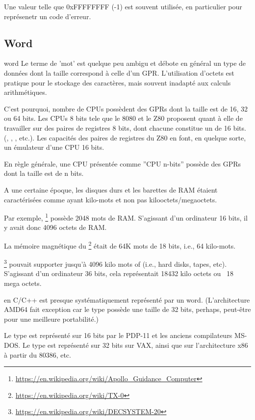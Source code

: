 Une valeur telle que 0xFFFFFFFF (-1) est souvent utilisée, en particulier pour représenetr un code d'erreur.

\subsection{Word}

\gls{word} Le terme de 'mot' est quelque peu ambigu et débote en général un type de données dont la taille correspond à celle d'un \ac{GPR}.
L'utilisation d'octets est pratique pour le stockage des caractères, mais souvent inadapté aux calculs arithmétiques.

C'est pourquoi, nombre de \ac{CPU}s possèdent des \ac{GPR}s dont la taille est de 16, 32 ou 64 bits.
Les CPUs 8 bits tele que le 8080 et le Z80 proposent quant à elle de travailler sur des paires de registres 8 bits, dont chacune constitue un  de 16 bits.
(, , , etc.).
Les capacités des paires de registres du Z80 en font, en quelque sorte, un émulateur d'une CPU 16 bits.

En règle générale, une CPU présentée comme ''CPU n-bits'' possède des \ac{GPR}s dont la taille est de n bits.

A une certaine époque, les disques durs et les barettes de \ac{RAM} étaient caractérisées comme ayant  kilo-mots 
et non pas  kilooctets/megaoctets.

Par exemple, \footnote{\url{https://en.wikipedia.org/wiki/Apollo_Guidance_Computer}}
possède 2048 mots de \ac{RAM}.
S'agissant d'un ordinateur 16 bits, il y avait donc 4096 octets de \ac{RAM}.

La mémoire magnétique du \footnote{\url{https://en.wikipedia.org/wiki/TX-0}} était de 64K mots de 18 bits,
i.e., 64 kilo-mots.

\footnote{\url{https://en.wikipedia.org/wiki/DECSYSTEM-20}}
pouvait supporter jusqu'à 4096 kilo mots of 
(i.e., hard disks, tapes, etc).
S'agissant d'un ordinateur 36 bits, cela représentait 18432 kilo octets ou ~18 mega octets.

\myhrule{}

 en C/C++ est presque systématiquement représenté par un \gls{word}.
(L'architecture AMD64 fait exception car le type  possède une taille de 32 bits, perhaps, peut-être pour une meilleure portabilité.)

Le type  est représenté sur 16 bits par le PDP-11 et les anciens compilateurs MS-DOS.
Le type  est représenté sur 32 bits sur VAX, ainsi que sur l'architecture x86 à partir du 80386, etc.

